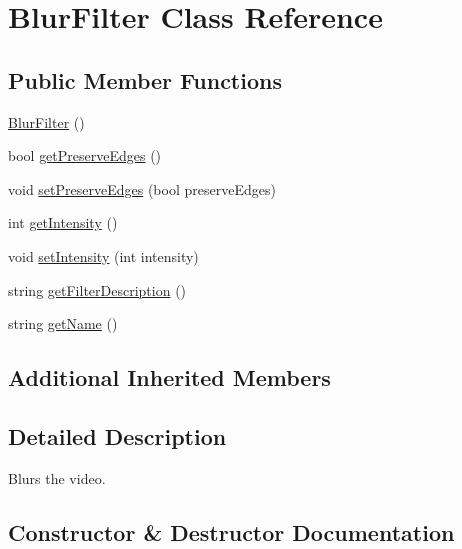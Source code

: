 \hypertarget{classModel_1_1Filter_1_1BlurFilter}{}\section{Blur\+Filter Class Reference}
\label{classModel_1_1Filter_1_1BlurFilter}
\subsection*{Public Member Functions}
\begin{DoxyCompactItemize}
\item 
\hyperlink{classModel_1_1Filter_1_1BlurFilter_afe4d07071313db8ac2e61b2641051b21}{Blur\+Filter} ()
\item 
bool \hyperlink{classModel_1_1Filter_1_1BlurFilter_a0f68baff76107f2b3982df5cca754340}{get\+Preserve\+Edges} ()
\item 
void \hyperlink{classModel_1_1Filter_1_1BlurFilter_a87c0326c6cec136fccffeca502d20ede}{set\+Preserve\+Edges} (bool preserve\+Edges)
\item 
int \hyperlink{classModel_1_1Filter_1_1BlurFilter_a708995fb1b6acb31ee0dfb0f4881e5b5}{get\+Intensity} ()
\item 
void \hyperlink{classModel_1_1Filter_1_1BlurFilter_ac8255ffbc46bb61acaa8fd23d0d260eb}{set\+Intensity} (int intensity)
\item 
string \hyperlink{classModel_1_1Filter_1_1BlurFilter_a62b7b60e24f92234393b840b35808e06}{get\+Filter\+Description} ()
\item 
string \hyperlink{classModel_1_1Filter_1_1BlurFilter_a11335e13e50af74108bf926dc1340b4b}{get\+Name} ()
\end{DoxyCompactItemize}
\subsection*{Additional Inherited Members}


\subsection{Detailed Description}
Blurs the video. 

\subsection{Constructor \& Destructor Documentation}
\hypertarget{classModel_1_1Filter_1_1BlurFilter_afe4d07071313db8ac2e61b2641051b21}{}
